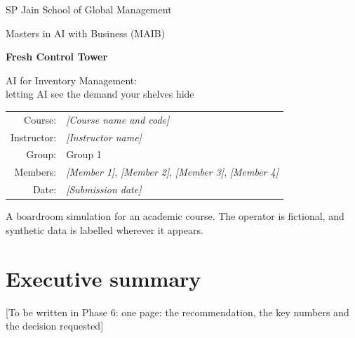 \documentclass[11pt,a4paper]{article}
\newcommand{\todophase}[1]{\textcolor{black!55}{[To be written in Phase 6: #1]}}
\begin{document}
\begin{titlepage}
  \centering
  {\Large SP Jain School of Global Management\par}
  \vspace{0.4cm}
  {\large Masters in AI with Business (MAIB)\par}
  \vspace{2.5cm}
  {\Huge\bfseries Fresh Control Tower\par}
  \vspace{0.5cm}
  {\Large AI for Inventory Management:\\ letting AI see the demand your shelves hide\par}
  \vspace{2.5cm}
  \begin{tabular}{rl}
    Course:     & \textit{[Course name and code]} \\
    Instructor: & \textit{[Instructor name]} \\
    Group:      & Group 1 \\
    Members:    & \textit{[Member 1]}, \textit{[Member 2]}, \textit{[Member 3]}, \textit{[Member 4]} \\
    Date:       & \textit{[Submission date]} \\
  \end{tabular}
  \vfill
  {\small A boardroom simulation for an academic course. The operator is fictional, and synthetic
  data is labelled wherever it appears.\par}
\end{titlepage}

\tableofcontents
\clearpage

\section*{Executive summary}
\todophase{one page: the recommendation, the key numbers and the decision requested}











\clearpage
\appendix






\clearpage
\printbibliography[heading=bibintoc,title={References}]
\end{document}
